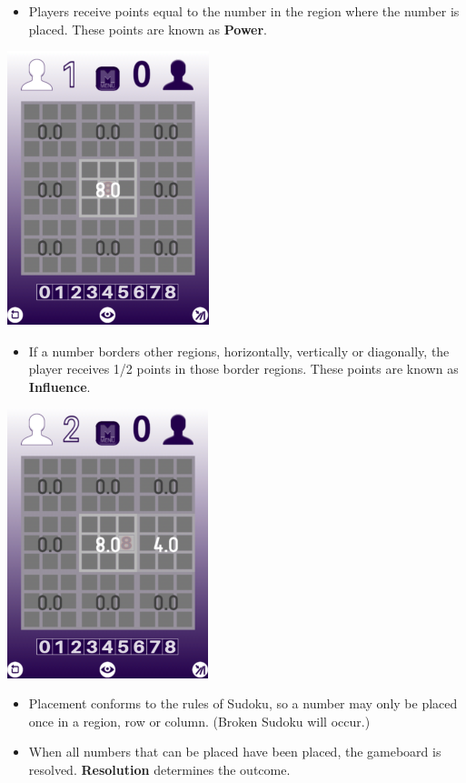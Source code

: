 \documentclass[a4paper]{article}
\begin{document}
\pagebreak
\begin{itemize}
    \item Players receive points equal to the number in the region where the number is placed. These points 
    are known as \textbf{Power}.
\end{itemize}
\begin{center}
    \includegraphics[scale=0.5]{img/tutorial_2.png}
\end{center}

\begin{itemize}
    \item If a number borders other regions, horizontally, vertically or diagonally, the player receives 
    1/2 points in those border regions.  These points are known as \textbf{Influence}.
\end{itemize}
\begin{center}
    \includegraphics[scale=0.5]{img/tutorial_3.png}
\end{center}

\begin{itemize}
    \item Placement conforms to the rules of Sudoku, so a number may only be placed once in a region, row or 
    column. (Broken Sudoku will occur.)
    \item When all numbers that can be placed have been placed, the gameboard is resolved. \textbf{Resolution} 
    determines the outcome.
\end{itemize}
\end{document}
